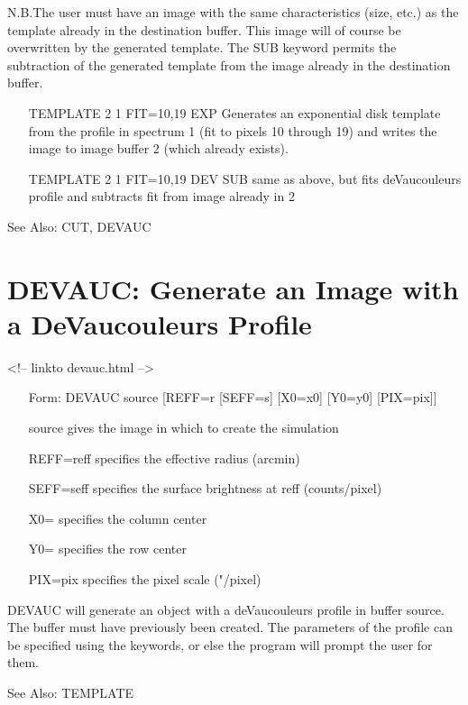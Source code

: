 N.B.The user must have an image with the same characteristics (size, etc.)
as the template already in the destination buffer.  This image will of
course be overwritten by the generated template.  The SUB keyword permits
the subtraction of the generated template from the image already in the
destination buffer.

\begin{itemize}
  \item[TEMPLATE 2 1 FIT=10,19 EXP\hfill]{Generates an exponential disk
       template from the profile in spectrum 1 (fit to pixels 10 through
       19) and writes the image to image buffer 2 (which already exists).}

  \item[TEMPLATE 2 1 FIT=10,19 DEV SUB \hfill]{same as above, but fits
       deVaucouleurs profile and subtracts fit from image already in 2}
\end{itemize}

See Also: CUT, DEVAUC


\section{DEVAUC: Generate an Image with a DeVaucouleurs Profile}
\begin{rawhtml}
<!-- linkto devauc.html -->
\end{rawhtml}
\begin{itemize}
  \item[Form: DEVAUC source [REFF=r] [SEFF=s] [X0=x0] [Y0=y0] 
       [PIX=pix]\hfill]{}
  \item[source]{gives the image in which to create the simulation}
  \item[REFF=reff]{specifies the effective radius (arcmin)}
  \item[SEFF=seff]{specifies the surface brightness at reff (counts/pixel)}
  \item[X0=]{specifies the column center}
  \item[Y0=]{specifies the row center}
  \item[PIX=pix]{specifies the pixel scale ("/pixel)}
\end{itemize}

DEVAUC will generate an object with a deVaucouleurs profile in buffer
source. The buffer must have previously been created. The parameters of the
profile can be specified using the keywords, or else the program will
prompt the user for them.

See Also:  TEMPLATE
